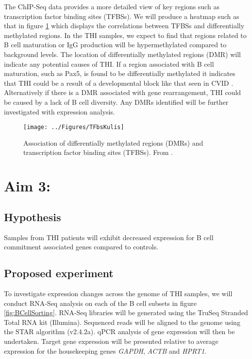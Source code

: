 \documentclass[12pt]{article}
\begin{document}
			The ChIP-Seq data provides a more detailed view of key regions such as transcription factor binding sites (TFBSs).
			We will produce a heatmap such as that in figure \ref{fig:TFBSheatmap} which displays the correlations between TFBSs and differentially methylated regions. 
			In the THI samples, we expect to find that regions related to B cell maturation or IgG production will be hypermethylated compared to background levels. 
			The location of differentially methylated regions (DMR) will indicate any potential causes of THI.
			If a region associated with B cell maturation, such as Pax5, is found to be differentially methylated it indicates that THI could be a result of a developmental block like that seen in CVID \citep{Tallmadge15}.
			Alternatively if there is a DMR associated with gene rearrangement, THI could be caused by a lack of B cell diversity.
			Any DMRs identified will be further investigated with expression analysis.
			
			\begin{figure}[tb]
				\centering
				\texttt{[image: ../Figures/TFbsKulis]}
				\caption{Association of differentially methylated regions (DMRs) and transcription factor binding sites (TFBSs). From \citet{Kulis15}.}
				\label{fig:TFBSheatmap}
			\end{figure}
		
	\section{Aim 3:}
	
		\subsection{Hypothesis}
			
			Samples from THI patients will exhibit decreased expression for B cell commitment associated genes compared to controls.
					
		\subsection{Proposed experiment}
			
			To investigate expression changes across the genome of THI samples, we will conduct RNA-Seq analysis on each of the B cell subsets in figure \ref{fig:BCellSorting}. 
			RNA-Seq libraries will be generated using the TruSeq Stranded Total RNA kit (Illumina). 
			Sequenced reads will be aligned to the genome using the STAR algorithm (v2.4.2a)\citep{Dobin13}.
			qPCR analysis of gene expression will then be undertaken. 
			Target gene expression will be presented relative to average expression for the housekeeping genes \textit{GAPDH}, \textit{ACTB} and \textit{HPRT1}.
			
\end{document}
